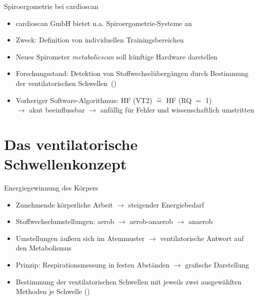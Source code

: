 \documentclass[colorBG,slideColor,8pt]{beamer}
\begin{document}
\begin{frame}{Spiroergometrie bei cardioscan}
\begin{itemize}
	\item cardioscan GmbH bietet u.a. Spiroergometrie-Systeme an
	\item Zweck: Definition von individuellen Trainingsbereichen
	\item Neues Spirometer \textsl{metabolicscan} soll künftige Hardware darstellen
	\item Forschungsstand: Detektion von Stoffwechselübergängen durch Bestimmung der ventilatorischen Schwellen~(\cite{Westhoff.2012})
	\item Vorheriger Software-Algorithmus: HF (VT2) $\hat{=}$  HF (RQ $=$ 1)\\$\rightarrow$ akut beeinflussbar $\rightarrow$ anfällig für Fehler und wissenschaftlich umstritten
\end{itemize}
\end{frame}


\section{Das ventilatorische Schwellenkonzept}

\begin{frame}{Energiegewinnung des Körpers}
\begin{itemize}
	\item Zunehmende körperliche Arbeit $\rightarrow$ steigender Energiebedarf
	\item Stoffwechselumstellungen: aerob $\rightarrow$ aerob-anaerob $\rightarrow$ anaerob
	\item Umstellungen äußern sich im Atemmuster $\rightarrow$ ventilatorische Antwort auf den Metabolismus
	\item Prinzip: Respirationsmessung in festen Abständen $\rightarrow$ grafische Darstellung
	\item Bestimmung der ventilatorischen Schwellen mit jeweils zwei ausgewählten Methoden je Schwelle (\cite{Westhoff.2012})
\end{itemize}
\end{frame}
\end{document}

